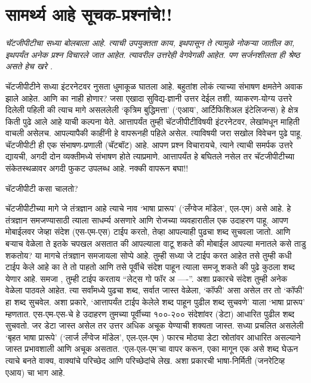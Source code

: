 \chapter{सामर्थ्य आहे सूचक-प्रश्नांचे!!}

{\textit{चॅटजीपीटीचा सध्या बोलबाला आहे.  त्याची उपयुक्तता काय,  इथपासून ते त्यामुळे नोकऱ्या जातील का,  इथपर्यंत अनेक प्रश्न विचारले जात आहेत.  त्यावरील उत्तरेही वेगवेगळी आहेत.  पण सर्जनशीलता ही श्रेष्ठ असते हेच खरे .  }}

\vspace{1.5em}

चॅटजीपीटीने सध्या इंटरनेटवर नुसता धुमाकूळ घातला आहे. बहुतांश लोकं त्याच्या संभाषण क्षमतेने अवाक झाले आहेत. आणि का नाही होणार? जसा एखादा सुविद्य-ज्ञानी उत्तर देईल तशी, व्याकरण-योग्य उत्तरे दिलेली पहिली की त्याच मागे असललेली `कृत्रिम बुद्धिमत्ता' (`एआय', आर्टिफिशिअल इंटेलिजन्स) हे क्षेत्र किती पुढे आले आहे याची कल्पना येते. आत्तापर्यंत तुम्ही चॅटजीपीटीविषयी इंटरनेटवर, लेखांमधून माहिती वाचली असेलच. आपल्यापैकी काहींनी हे वापरूनही पहिले असेल. त्याविषयी जरा सखोल विवेचन पुढे पाहू. चॅटजीपीटी ही एक संभाषण-प्रणाली (चॅटबॉट) आहे. आपण प्रश्न विचारायचे, त्याने त्याची समर्पक उत्तरे द्यायची, अगदी दोन व्यक्तीमध्ये संभाषण होते त्याप्रमाणे. आत्तापर्यंत हे बघितले नसेल तर चॅटजीपीटीच्या संकेतस्थळावर अगदी फुकट उपलब्ध आहे. नक्की वापरून बघा!!

चॅटजीपीटी कसा चालतो?

चॅटजीपीटीच्या मागे जे तंत्रज्ञान आहे त्याचे नाव `भाषा प्रारूप' (`लँग्वेज मॉडेल', एल-एम) असे आहे. हे तंत्रज्ञान समजण्यासाठी त्याला साधर्म्य असणारे आणि रोजच्या व्यवहारातील एक उदाहरण पाहू. आपण मोबाईलवर जेव्हा संदेश (एस-एम-एस) टाईप करतो, तेव्हा आपल्याही पुढचा शब्द सुचवला जातो. आणि बऱ्याच वेळेला ते इतके चपखल असतात की आपल्याला वाटू शकते की मोबाईल आपल्या मनातले कसे ताडु शकतोय? या मागचे तंत्रज्ञान समजायला सोप्पे आहे. तुम्ही सध्या जे टाईप करत आहेत तसे तुम्ही कधी टाईप केले आहे का ते तो पाहतो आणि तसे पूर्वीचे संदेश पाहून त्याला समजू शकते की पुढे कुठला शब्द येणार आहे. समजा , तुम्ही टाईप करताय ``लेट्स गो फॉर अ ----''. अशा प्रकारचे संदेश तुम्ही अनेक वेळेला पाठवले आहेत. त्या सर्वांमध्ये पुढचा शब्द, सर्वात जास्त वेळेला, `कॉफी' असा असेल तर तो `कॉफी' हा शब्द सुचवेल. अशा प्रकारे, `आत्तापर्यंत टाईप केलेले शब्द पाहून पुढील शब्द सुचवणे' याला `भाषा प्रारूप' म्हणतात. एस-एम-एस-चे हे उदाहरण तुमच्या पूर्वीच्या १००-२०० संदेशांवर (डेटा) आधारित पुढील शब्द सुचवतो. जर डेटा जास्त असेल तर उत्तर अधिक अचूक येण्याची शक्यता जास्त. सध्या प्रचलित असलेली `बृहत भाषा प्रारूपे' (`लार्ज लँग्वेज मॉडेल', एल-एल-एम ) फारच मोठ्या डेटा स्रोतांवर आधारित असल्याने जास्त प्रभावशाली आणि अचूक असतात. `एल-एल-एम'चा वापर करून, एका मागून एक असे शब्द घेऊन त्याचे बनते वाक्य, वाक्यांचे परिच्छेद आणि परिच्छेदांचे लेख. अशा प्रकारची भाषा-निर्मिती (जनरेटिव्ह एआय) चा भाग आहे.

